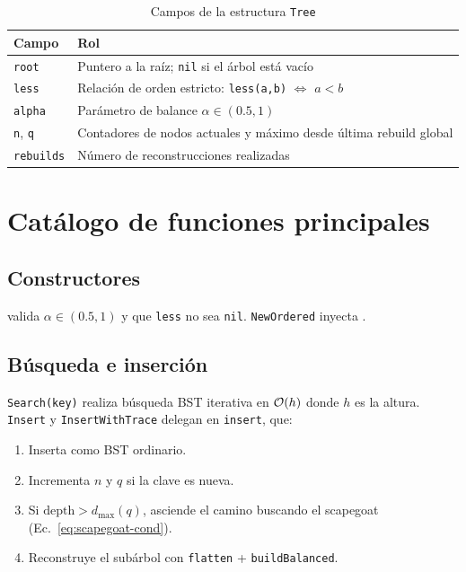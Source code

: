 \begin{table}[H]
  \centering
  \caption{Campos de la estructura \texttt{Tree}}
  \begin{tabular}{@{}lp{9cm}@{}}
    \toprule
    \textbf{Campo} & \textbf{Rol} \\
    \midrule
    \texttt{root} & Puntero a la raíz; \texttt{nil} si el árbol está vacío \\
    \texttt{less} & Relación de orden estricto: \texttt{less(a,b)} $\Leftrightarrow$ $a < b$ \\
    \texttt{alpha} & Parámetro de balance $\alpha \in (0.5, 1)$ \\
    \texttt{n}, \texttt{q} & Contadores de nodos actuales y máximo desde última rebuild global \\
    \texttt{rebuilds} & Número de reconstrucciones realizadas \\
    \bottomrule
  \end{tabular}
\end{table}

\section{Catálogo de funciones principales}

\subsection{Constructores}

 valida $\alpha \in (0.5, 1)$ y que \texttt{less} no sea \texttt{nil}. \texttt{NewOrdered} inyecta .

\subsection{Búsqueda e inserción}

\texttt{Search(key)} realiza búsqueda BST iterativa en $\mathcal{O}(h)$ donde $h$ es la altura. \texttt{Insert} y \texttt{InsertWithTrace} delegan en \texttt{insert}, que:
\begin{enumerate}[noitemsep]
  \item Inserta como BST ordinario.
  \item Incrementa $n$ y $q$ si la clave es nueva.
  \item Si $\mathrm{depth} > d_{\max}(q)$, asciende el camino buscando el scapegoat (Ec.~\ref{eq:scapegoat-cond}).
  \item Reconstruye el subárbol con \texttt{flatten} + \texttt{buildBalanced}.
\end{enumerate}

